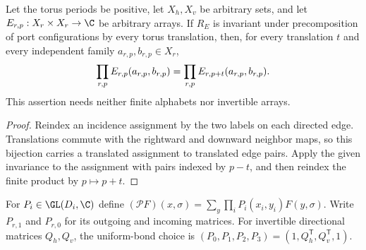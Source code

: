 \begin{lemma}%
    \label{thm:peps_independent_port_translation}
    \leanok
    Let the torus periods be positive, let $X_h,X_v$ be arbitrary sets,
    and let $E_{r,p}:X_r\times X_r\to\C$ be arbitrary arrays.
    If $R_E$ is invariant under precomposition of port configurations by
    every torus translation, then, for every translation $t$ and every
    independent family $a_{r,p},b_{r,p}\in X_r$,
    \begin{align}
        \prod_{r,p}E_{r,p}(a_{r,p},b_{r,p})
        =\prod_{r,p}E_{r,p+t}(a_{r,p},b_{r,p}).\notag
    \end{align}
    This assertion needs neither finite alphabets nor invertible arrays.
\end{lemma}
\begin{proof}\leanok
    Reindex an incidence assignment by the two labels on each directed
    edge. Translations commute with the rightward and downward neighbor
    maps, so this bijection carries a translated assignment to translated
    edge pairs. Apply the given invariance to the assignment with pairs
    indexed by $p-t$, and then reindex the finite product by $p\mapsto p+t$.
\end{proof}

\begin{definition}%
    \label{def:peps_common_four_leg_transformation}
    \leanok
    For $P_i\in\GL(D_i,\C)$ define
    $(\mathcal P F)(x,\sigma)=\sum_y\prod_iP_i(x_i,y_i)F(y,\sigma)$.
    Write $P_{r,1}$ and $P_{r,0}$ for its outgoing and incoming matrices.
    For invertible directional matrices $Q_h,Q_v$, the uniform-bond choice is
    $(P_0,P_1,P_2,P_3)=(1,Q_h^{\mathsf T},Q_v^{\mathsf T},1)$.
\end{definition}

